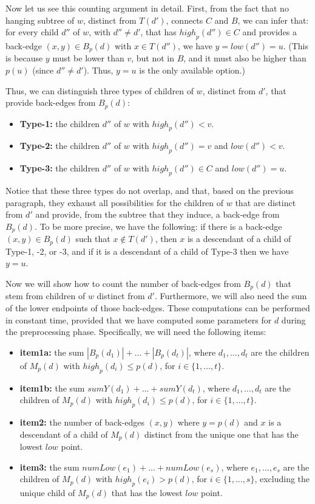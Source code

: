 \documentclass[11pt,a4paper]{article}
\begin{document}
Now let us see this counting argument in detail. First, from the fact that no hanging subtree of $w$, distinct from $T(d')$, connects $C$ and $B$, we can infer that: for every child $d''$ of $w$, with $d''\neq d'$, that has $\mathit{high}_p(d'')\in C$ and provides a back-edge $(x,y)\in B_p(d)$ with $x\in T(d'')$, we have $y=\mathit{low}(d'')=u$. (This is because $y$ must be lower than $v$, but not in $B$, and it must also be higher than $p(u)$ (since $d''\neq d'$). Thus, $y=u$ is the only available option.) 

Thus, we can distinguish three types of children of $w$, distinct from $d'$, that provide back-edges from $B_p(d)$: 

\begin{itemize}
\item[]{\textbf{Type-1:} the children $d''$ of $w$ with $\mathit{high}_p(d'')<v$.}
\item[]{\textbf{Type-2:} the children $d''$ of $w$ with $\mathit{high}_p(d'')=v$ and $\mathit{low}(d'')<v$.}
\item[]{\textbf{Type-3:} the children $d''$ of $w$ with $\mathit{high}_p(d'')\in C$ and $\mathit{low}(d'')=u$.}
\end{itemize}

Notice that these three types do not overlap, and that, based on the previous paragraph, they exhaust all possibilities for the children of $w$ that are distinct from $d'$ and provide, from the subtree that they induce, a back-edge from $B_p(d)$. To be more precise, we have the following: if there is a back-edge $(x,y)\in B_p(d)$ such that $x\notin T(d')$, then $x$ is a descendant of a child of Type-1, -2, or -3, and if it is a descendant of a child of Type-3 then we have $y=u$.

Now we will show how to count the number of back-edges from $B_p(d)$ that stem from children of $w$ distinct from $d'$. Furthermore, we will also need the sum of the lower endpoints of those back-edges. These computations can be performed in constant time, provided that we have computed some parameters for $d$ during the preprocessing phase. Specifically, we will need the following items:

\begin{itemize}
\item[]{\textbf{item1a:} the sum $|B_p(d_1)|+\dots+|B_p(d_t)|$, where $d_1,\dots,d_t$ are the children of $M_p(d)$ with $\mathit{high}_p(d_i)\leq p(d)$, for $i\in\{1,\dots,t\}$.}
\item[]{\textbf{item1b:} the sum $\mathit{sumY}(d_1)+\dots+\mathit{sumY}(d_t)$, where $d_1,\dots,d_t$ are the children of $M_p(d)$ with $\mathit{high}_p(d_i)\leq p(d)$, for $i\in\{1,\dots,t\}$.}
\item[]{\textbf{item2:} the number of back-edges $(x,y)$ where $y=p(d)$ and $x$ is a descendant of a child of $M_p(d)$ distinct from the unique one that has the lowest $\mathit{low}$ point.}
\item[]{\textbf{item3:} the sum $\mathit{numLow}(e_1)+\dots+\mathit{numLow}(e_s)$, where $e_1,\dots,e_s$ are the children of $M_p(d)$ with $\mathit{high}_p(e_i)>p(d)$, for $i\in\{1,\dots,s\}$, excluding the unique child of $M_p(d)$ that has the lowest $\mathit{low}$ point.}
\end{itemize}
\end{document}
